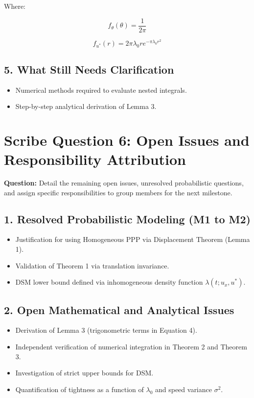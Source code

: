 \documentclass[12pt,a4paper]{article}
\begin{document}
Where:

\[
f_{\theta}(\theta) = \frac{1}{2\pi}
\]

\[
f_{u^*}(r) = 2\pi\lambda_0 r e^{-\pi\lambda_0 r^2}
\]

\subsection{5. What Still Needs Clarification}

\begin{itemize}
    \item Numerical methods required to evaluate nested integrals.
    \item Step-by-step analytical derivation of Lemma 3.
\end{itemize}

\newpage
\section{Scribe Question 6: Open Issues and Responsibility Attribution}

\textbf{Question:} Detail the remaining open issues, unresolved probabilistic questions, and assign specific responsibilities to group members for the next milestone.

\subsection{1. Resolved Probabilistic Modeling (M1 to M2)}

\begin{itemize}
    \item Justification for using Homogeneous PPP via Displacement Theorem (Lemma 1).
    \item Validation of Theorem 1 via translation invariance.
    \item DSM lower bound defined via inhomogeneous density function $\lambda(t; u_x, u^*)$.
\end{itemize}

\subsection{2. Open Mathematical and Analytical Issues}

\begin{itemize}
    \item Derivation of Lemma 3 (trigonometric terms in Equation 4).
    \item Independent verification of numerical integration in Theorem 2 and Theorem 3.
    \item Investigation of strict upper bounds for DSM.
    \item Quantification of tightness as a function of $\lambda_0$ and speed variance $\sigma^2$.
\end{itemize}
\end{document}
